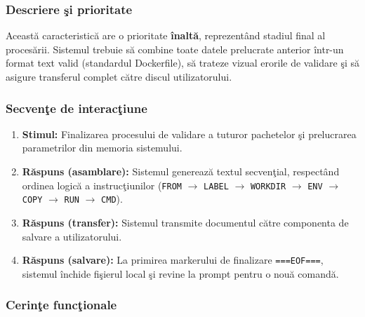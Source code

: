 \documentclass[12pt, a4paper]{article}
\begin{document}
\subsubsection{Descriere \c{s}i prioritate}

Aceast\u{a} caracteristic\u{a} are o prioritate \textbf{înalt\u{a}}, reprezent\^{a}nd stadiul final al proces\u{a}rii. Sistemul
trebuie s\u{a} combine toate datele prelucrate anterior \^{i}ntr-un format text valid (standardul Dockerfile),
s\u{a} trateze vizual erorile de validare \c{s}i s\u{a} asigure transferul complet c\u{a}tre discul utilizatorului.

\subsubsection{Secven\c{t}e de interac\c{t}iune}

\begin{enumerate}
    \item \textbf{Stimul:} Finalizarea procesului de validare a tuturor pachetelor \c{s}i prelucrarea
    parametrilor din memoria sistemului.
    \item \textbf{R\u{a}spuns (asamblare):} Sistemul genereaz\u{a} textul secven\c{t}ial, respect\^{a}nd ordinea
    logic\u{a} a instruc\c{t}iunilor (\texttt{FROM} $\rightarrow$ \texttt{LABEL} $\rightarrow$ \texttt{WORKDIR}
    $\rightarrow$ \texttt{ENV} $\rightarrow$ \texttt{COPY} $\rightarrow$ \texttt{RUN} $\rightarrow$ \texttt{CMD}).
    \item \textbf{R\u{a}spuns (transfer):} Sistemul transmite documentul c\u{a}tre componenta de salvare a
    utilizatorului.
    \item \textbf{R\u{a}spuns (salvare):} La primirea markerului de finalizare \texttt{===EOF===}, sistemul
    \^{i}nchide fi\c{s}ierul local \c{s}i revine la prompt pentru o nou\u{a} comand\u{a}.
\end{enumerate}

\subsubsection{Cerin\c{t}e func\c{t}ionale}
\end{document}
